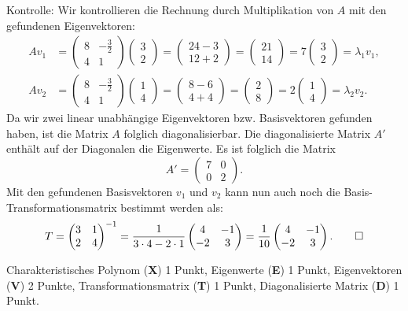 \begin{loesung}
Kontrolle: Wir kontrollieren die Rechnung durch Multiplikation von $A$
mit den gefundenen Eigenvektoren:
\begin{align*}
Av_1&=\begin{pmatrix}8&-\frac{3}{2}\\4 & 1\end{pmatrix}\begin{pmatrix}3\\2\end{pmatrix}
=\begin{pmatrix}24-3\\ 12 + 2\end{pmatrix}
=\begin{pmatrix}21\\ 14\end{pmatrix}=7\begin{pmatrix}3\\2\end{pmatrix}
=\lambda_1v_1,\\
Av_2&=\begin{pmatrix}8&-\frac{3}{2}\\4 & 1\end{pmatrix}\begin{pmatrix}1\\4\end{pmatrix}
=\begin{pmatrix}8-6\\4+4 \end{pmatrix}
=\begin{pmatrix}2\\8 \end{pmatrix}=2\begin{pmatrix}1\\4\end{pmatrix}
=\lambda_2v_2.
\end{align*}
Da wir zwei linear unabhängige Eigenvektoren bzw. Basisvektoren gefunden haben,
ist die Matrix $A$ folglich diagonalisierbar.
Die diagonalisierte Matrix $A'$ enthält auf der Diagonalen die
Eigenwerte. Es ist folglich die Matrix
\[
A'=\begin{pmatrix}7&0 \\0 & 2\end{pmatrix}.
\]
Mit den gefundenen Basisvektoren $v_1$ und $v_2$ kann nun auch noch die 
Basis-Transformationsmatrix bestimmt werden als:
\[
  T = \begin{pmatrix}3&1\\2&4\end{pmatrix}^{-1}
  = \dfrac{1}{3\cdot 4 - 2\cdot 1}\begin{pmatrix}4&-1\\-2&3\end{pmatrix}
  = \dfrac{1}{10}\begin{pmatrix}4&-1\\-2&3\end{pmatrix}.
  \qedhere
\]
\end{loesung}

\begin{bewertung}
Charakteristisches Polynom ({\bf X}) 1 Punkt,
Eigenwerte ({\bf E}) 1 Punkt,
Eigenvektoren ({\bf V}) 2 Punkte,
Transformationsmatrix ({\bf T}) 1 Punkt,
Diagonalisierte Matrix ({\bf D}) 1 Punkt.
\end{bewertung}


